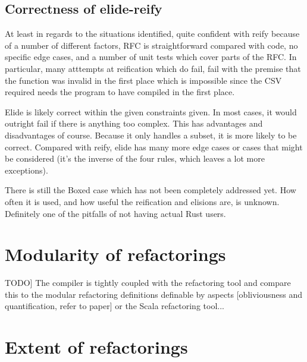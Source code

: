 \subsection{Correctness of elide-reify}

At least in regards to the situations identified, quite confident with reify because of a number of different factors, RFC is straightforward compared with code, no specific edge cases, and a number of unit tests which cover parts of the RFC. In particular, many atttempts at reification which do fail, fail with the premise that the function was invalid in the first place which is impossible since the CSV required needs the program to have compiled in the first place. 


Elide is likely correct within the given constraints given. In most cases, it would outright fail if there is anything too complex. This has advantages and disadvantages of course. Because it only handles a subset, it is more likely to be correct. Compared with reify, elide has many more edge cases or cases that might be considered (it's the inverse of the four rules, which leaves a lot more exceptions).

There is still the Boxed case which has not been completely addressed yet. How often it is used, and how useful the reification and elisions are, is unknown. Definitely one of the pitfalls of not having actual Rust users. 


\section{Modularity of refactorings}
TODO] The compiler is tightly coupled with the refactoring tool and compare this to the modular refactoring definitions definable by aspects [obliviousness and quantification, refer to paper] or the Scala refactoring tool... 


\section{Extent of refactorings}

